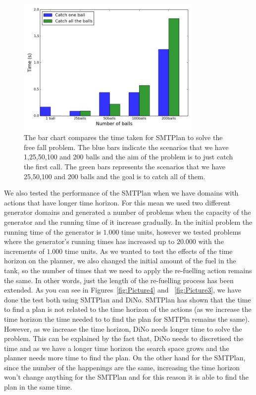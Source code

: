 \begin{figure}[!ht]
\centering
\includegraphics[width=0.80\textwidth]{diagrams/Balls.png}
\caption{The bar chart compares the time taken for SMTPlan to solve the free fall problem. The blue bars indicate the scenarios that we have 1,25,50,100 and 200 balls and the aim of the problem is to just catch the first call. The green bars represents the scenarios that we have 25,50,100 and 200 balls and the goal is to catch all of them.}
\label{fig:Picture1}
\end{figure}

We also tested the performance of the SMTPlan when we have domains with actions that have longer time horizon. For this mean we used two different generator domains and generated a number of problems when the capacity of the generator and the running time of it increase gradually. In the initial problem the running time of the generator is $\num{1.000}$ time units, however we tested problems where the generator's running times has increased up to $\num{20.000}$ with the increments of $\num{1.000}$ time units. As we wanted to test the effects of the time horizon on the planner, we also changed the initial amount of the fuel in the tank, so the number of times that we need to apply the re-fuelling action remains the same. In other words, just the length of the re-fuelling process has been extended. As you can see in Figures~\ref{fig:Picture4} and ~\ref{fig:Picture3}, we have done the test both using SMTPlan and DiNo. SMTPlan has shown that the time to find a plan is not related to the time horizon of the actions (as we increase the time horizon the time needed to to find the plan for SMTPln remains the same). However, as we increase the time horizon, DiNo needs longer time to solve the problem. This can be explained by the fact that, DiNo needs to discretised the time and as we have a longer time horizon the search space grows and the planner needs more time to find the plan. On the other hand for the SMTPlan, since the number of the happenings are the same, increasing the time horizon won't change anything for the SMTPlan and for this reason it is able to find the plan in the same time.  

